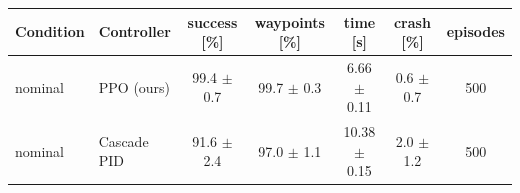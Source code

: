 \begin{tabular}{llccccc}\toprule
Condition & Controller & success [\%] & waypoints [\%] & time [s] & crash [\%] & episodes\\\midrule
nominal & PPO (ours) & 99.4 $\pm$ 0.7 & 99.7 $\pm$ 0.3 & 6.66 $\pm$ 0.11 & 0.6 $\pm$ 0.7 & 500\\
nominal & Cascade PID & 91.6 $\pm$ 2.4 & 97.0 $\pm$ 1.1 & 10.38 $\pm$ 0.15 & 2.0 $\pm$ 1.2 & 500\\
\bottomrule\end{tabular}
